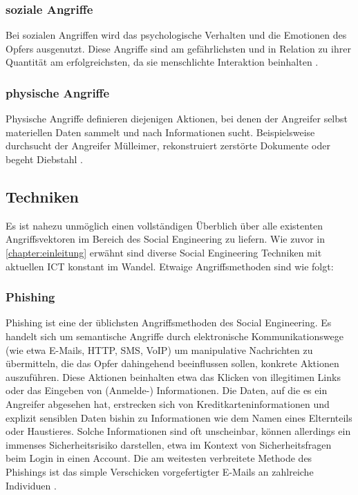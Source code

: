 \subsubsection{soziale Angriffe}
Bei sozialen Angriffen wird das psychologische Verhalten und die Emotionen des Opfers ausgenutzt. Diese Angriffe sind am gefährlichsten und in Relation zu ihrer Quantität am
erfolgreichsten, da sie menschlichte Interaktion beinhalten .

\subsubsection{physische Angriffe}
Physische Angriffe definieren diejenigen Aktionen, bei denen der Angreifer selbst materiellen Daten sammelt und nach Informationen sucht.
Beispielsweise durchsucht der Angreifer Mülleimer,
rekonstruiert zerstörte Dokumente oder begeht Diebstahl .

\subsection{Techniken}

Es ist nahezu unmöglich einen vollständigen Überblich über alle existenten Angriffsvektoren im Bereich des Social Engineering
zu liefern. Wie zuvor in \autoref{chapter:einleitung} erwähnt sind diverse Social Engineering Techniken mit aktuellen ICT konstant im Wandel.
Etwaige Angriffsmethoden sind wie folgt:

\subsubsection{Phishing}
\label{phishing}
Phishing ist eine der üblichsten Angriffsmethoden des Social Engineering. Es handelt sich um semantische Angriffe durch elektronische
Kommunikationswege (wie etwa E-Mails, HTTP, SMS, VoIP) um manipulative Nachrichten zu übermitteln, die das Opfer dahingehend beeinflussen
sollen, konkrete Aktionen auszuführen. Diese Aktionen beinhalten etwa das Klicken von illegitimen Links oder das Eingeben von (Anmelde-) Informationen.
Die Daten, auf die es ein Angreifer abgesehen hat, erstrecken sich von Kreditkarteninformationen und explizit sensiblen Daten bishin zu Informationen
wie dem Namen eines Elternteils oder Haustieres. Solche Informationen sind oft unscheinbar, können allerdings ein immenses Sicherheitsrisiko
darstellen, etwa im Kontext von Sicherheitsfragen beim Login in einen Account. Die am weitesten verbreitete Methode des Phishings ist das
simple Verschicken vorgefertigter E-Mails an zahlreiche Individuen .


